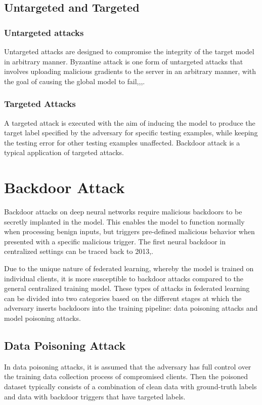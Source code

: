 \documentclass[conference]{IEEEtran}
\begin{document}
\subsection{Untargeted and Targeted}
\subsubsection{Untargeted attacks}Untargeted attacks are designed to compromise
the integrity of the target model in  arbitrary manner.
Byzantine attack is one form of untargeted attacks that involves
uploading malicious gradients to the server in an arbitrary manner,
with the goal of causing the global model to fail\cite{b48},\cite{b49},\cite{b50},\cite{b51}.
\subsubsection{Targeted Attacks}A targeted attack is executed with
the aim of inducing the model to produce the target label specified by the
adversary for specific testing examples, while keeping the testing error for
other testing examples unaffected\cite{b51}. Backdoor attack is a typical application of targeted attacks.


\section{Backdoor Attack}
Backdoor attacks on deep neural networks require malicious backdoors to be secretly implanted in the model. 
This enables the model to function
normally when processing benign inputs, but triggers  pre-defined
malicious behavior when presented with a specific malicious trigger.
The first neural backdoor in centralized settings can be traced
back to 2013\cite{b52},\cite{b53}.

Due to the unique nature of federated learning, whereby the model is trained
on individual clients, it is more susceptible to backdoor attacks compared
to the general centralized training model. These types of attacks in federated
learning can be divided into two categories based on the different stages at
which the adversary inserts backdoors into the training pipeline: data
poisoning attacks and model poisoning attacks.

\subsection{Data Poisoning Attack}
In data poisoning attacks, it is assumed that the adversary has full control
over the training data collection process of compromised clients. Then the poisoned
dataset typically consists of a combination of clean data with ground-truth labels
and data with backdoor triggers that have targeted labels.
\end{document}
